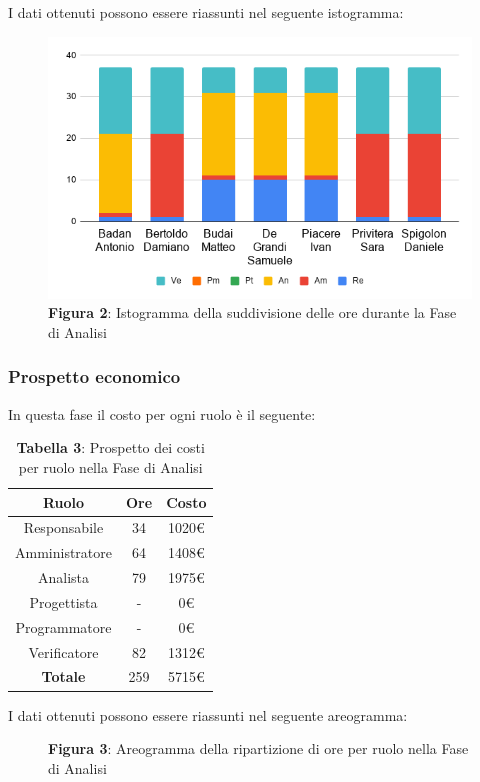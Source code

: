 I dati ottenuti possono essere riassunti nel seguente istogramma:
\begin{figure}[H]
	\centering
	\includegraphics[width=0.7\linewidth]{res/images/IstogrammaFase1.png}
	\caption*{\textbf{Figura 2}: Istogramma della suddivisione delle ore durante la Fase di Analisi}
	\label{fig:Figura2}
\end{figure}

\subsubsection{Prospetto economico}
In questa fase il costo per ogni ruolo è il seguente:

\begin{table}[H]
	\centering
	\renewcommand{\arraystretch}{1.5}
	\begin{tabular}{|c|c|c|}
		\hline
		\rowcolor{lighter-grayer}
Ruolo & Ore & Costo \\ \hline
Responsabile & 34 & 1020\euro \\ \hline
Amministratore & 64 & 1408\euro \\ \hline
Analista & 79 & 1975\euro \\ \hline
Progettista & - & 0\euro \\ \hline
Programmatore & - & 0\euro \\ \hline
Verificatore & 82 & 1312\euro \\ \hline
\textbf{Totale} & 259 & 5715\euro \\ \hline
\end{tabular}
	\caption*{\textbf{Tabella 3}: Prospetto dei costi per ruolo nella Fase di Analisi\\}
\end{table}
I dati ottenuti possono essere riassunti nel seguente areogramma:
\begin{figure}[H]
	\centering
	\caption*{\textbf{Figura 3}:  Areogramma della ripartizione di ore per ruolo nella Fase di Analisi}
	\label{fig:Figura3}
\end{figure}	



